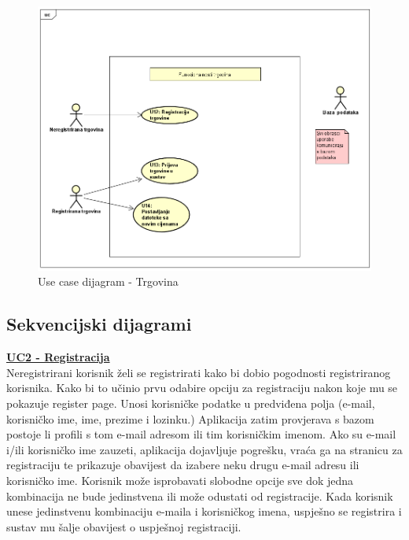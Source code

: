 			\begin{figure}[H]
			\includegraphics[width=\textwidth]{slike/Trgovina.PNG} %
			\caption{Use case dijagram - Trgovina}
			\label{fig:Trgovina} %
			\end{figure}
				\eject		
				
			\subsection{Sekvencijski dijagrami}
				
				
				\underline{\textbf{UC2 - Registracija}}\\
				
				Neregistrirani korisnik želi se registrirati kako bi dobio pogodnosti registriranog korisnika. Kako bi to učinio prvu odabire opciju za registraciju nakon koje mu se pokazuje register page. Unosi korisničke podatke u predviđena polja (e-mail, korisničko ime, ime, prezime i lozinku.) Aplikacija zatim provjerava s bazom postoje li profili s tom e-mail adresom ili tim korisničkim imenom. Ako su e-mail i/ili korisničko ime zauzeti, aplikacija dojavljuje pogrešku, vraća ga na stranicu za registraciju te prikazuje obavijest da izabere neku drugu e-mail adresu ili korisničko ime. Korisnik može isprobavati slobodne opcije sve dok jedna kombinacija ne bude jedinstvena ili može odustati od registracije. Kada korisnik unese jedinstvenu kombinaciju e-maila i korisničkog imena, uspješno se registrira i sustav mu šalje obavijest o uspješnoj registraciji.
				
